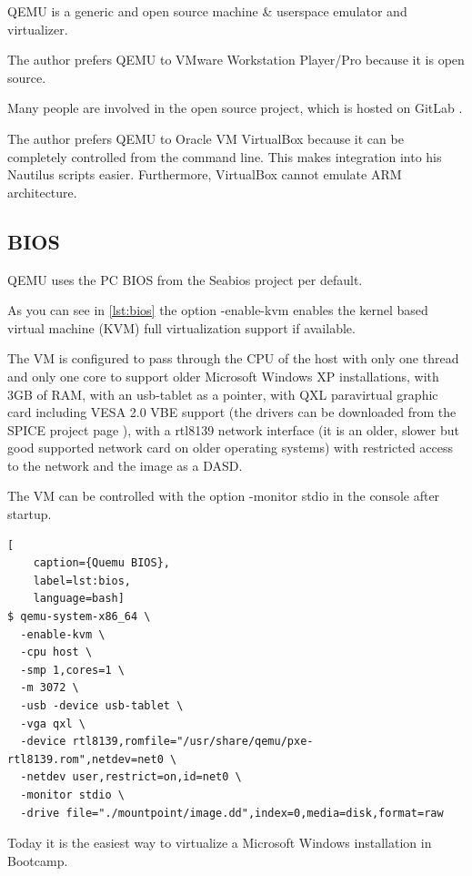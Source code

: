 QEMU is a generic and open source machine \& userspace emulator and
virtualizer.

The author prefers QEMU to VMware Workstation Player/Pro because it is open source.

Many people are involved in the open source project, which is hosted on  GitLab \cite{Qemu}.

The author prefers QEMU to Oracle VM VirtualBox because it can be completely controlled from the command line. This makes integration into his Nautilus scripts easier. Furthermore, VirtualBox cannot emulate ARM architecture.

\subsection{BIOS}

QEMU uses the PC BIOS from the Seabios project per default.

As you can see in \cref{lst:bios} the option \glqq{}-enable-kvm\grqq{} enables the kernel based virtual machine (KVM) full virtualization support if available.

The VM is configured to pass through the CPU of the host with only one thread and only one core to support older Microsoft Windows XP installations, with 3GB of RAM, with an usb-tablet as a pointer, with QXL paravirtual graphic card including VESA 2.0 VBE support (the drivers can be downloaded from the SPICE project page \cite{Spice}), with a rtl8139 network interface (it is an older, slower but good supported network card on older operating systems) with restricted access to the network and the image as a DASD.

The VM can be controlled with the option \glqq{}-monitor stdio\grqq{}  in the console after startup.

\begin{lstlisting}[
    caption={Quemu BIOS},
    label=lst:bios,
    language=bash]
$ qemu-system-x86_64 \
  -enable-kvm \
  -cpu host \
  -smp 1,cores=1 \
  -m 3072 \
  -usb -device usb-tablet \
  -vga qxl \
  -device rtl8139,romfile="/usr/share/qemu/pxe-rtl8139.rom",netdev=net0 \
  -netdev user,restrict=on,id=net0 \
  -monitor stdio \
  -drive file="./mountpoint/image.dd",index=0,media=disk,format=raw
\end{lstlisting}

\noindent Today it is the easiest way to virtualize a Microsoft Windows installation in Bootcamp.

